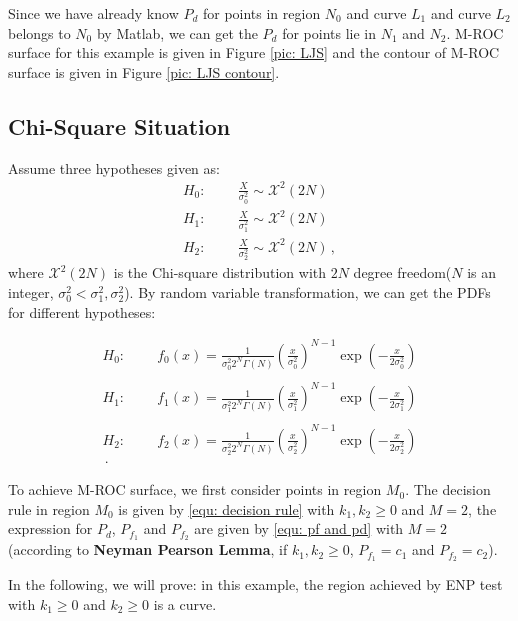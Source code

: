 \documentclass[12pt,journal,a4paper,twoside,onecolumn]{IEEEtran}
\begin{document}
\begin{spacing}{2.5}
Since we have already know $P_d$ for points in region $N_0$ and curve $L_1$ and curve $L_2$ belongs to $N_0$ by Matlab, we can get the $P_d$ for points lie in $N_1$ and $N_2$. M-ROC surface for this example is given in Figure  \ref{pic: LJS} and the contour of M-ROC surface is given in Figure \ref{pic: LJS contour}.

\subsection{Chi-Square Situation}
Assume three hypotheses  given as:
\begin{equation}
  \label{equ: Chisquare Hypothesis}
  \begin{split}
    H_0:\;\;\;\;\;\;\;\;\frac{X}{\sigma_0^2} \sim \mathcal{X}^2(2N)\\
    H_1:\;\;\;\;\;\;\;\;\frac{X}{\sigma_1^2} \sim \mathcal{X}^2(2N)\\
    H_2:\;\;\;\;\;\;\;\;\frac{X}{\sigma_2^2} \sim \mathcal{X}^2(2N)\,,
  \end{split}
\end{equation}
where $\mathcal{X}^2(2N)$ is the Chi-square distribution with  $2N$ degree freedom($N$ is an integer, $\sigma_0^2 < \sigma_1^2, \sigma_2^2$). By random variable transformation\cite{mark2011probability}, we can get the PDFs for different hypotheses:

\def \CHISQU[#1]{\frac{1}{#1 2^N\Gamma(N)}\left(\frac{x}{#1}\right)^{N-1}\exp\left(-\frac{x}{2#1}\right)\\}
\begin{equation}
  \label{equ: Chisquare Distribution}
  \begin{split}
    H_0:\;\;\;\;\;\;\;\;f_0(x) = \CHISQU[\sigma_0^2]\\
    H_1:\;\;\;\;\;\;\;\;f_1(x) = \CHISQU[\sigma_1^2]\\
    H_2:\;\;\;\;\;\;\;\;f_2(x) = \CHISQU[\sigma_2^2]\,.
  \end{split}
\end{equation}

To achieve M-ROC surface, we first consider points in region $M_0$.  The decision rule in region $M_0$ is given by \eqref{equ: decision rule}
with $k_1, k_2 \geq 0$ and $M = 2$, the expression for $P_d$, $P_{f_1}$ and $P_{f_2}$ are given by \eqref{equ: pf and pd} with $M = 2$ (according to \textbf{Neyman Pearson Lemma}, if $k_1, k_2 \geq 0$, $P_{f_1} = c_1$ and $P_{f_2} = c_2$).

In the following, we will prove: in this example, the region achieved by ENP test with $k_1 \geq 0$ and $k_2 \geq 0$ is a curve.


\end{spacing}
\end{document}
